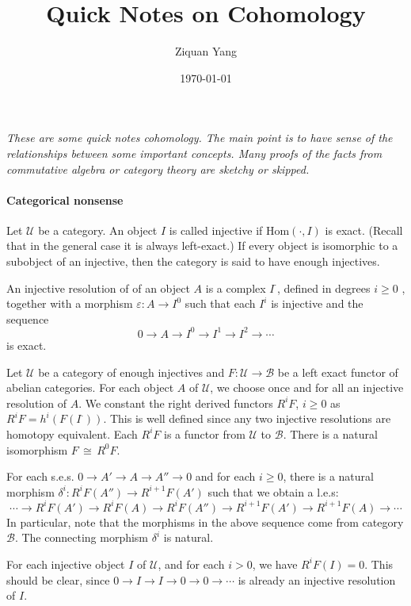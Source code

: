 \documentclass[12pt]{article}
\theoremstyle{plain}
\theoremstyle{definition}
\newcommand{\sB}{\mathcal{B}}
\newcommand{\sU}{\mathcal{U}}
\newcommand{\Hom}{\mathrm{Hom}}
\newcommand\iso{{\, \cong \,}}
\newcommand{\<}{\langle}
\renewcommand{\>}{\rangle}
\newcommand{\sm}{\varepsilon}
\begin{document}
%

\title{Quick Notes on Cohomology}
\author{Ziquan Yang}


\date{\today}

\maketitle

\textsl{These are some quick notes cohomology. The main point is to have sense of the relationships between some important concepts. Many proofs of the facts from commutative algebra or category theory are sketchy or skipped.}
 


\setcounter{section}{0}
\paragraph{Categorical nonsense}
Let $\sU$ be a category. An object $I$ is called injective if $\Hom(\cdot, I)$ is exact. (Recall that in the general case it is always left-exact.) If every object is isomorphic to a subobject of an injective, then the category is said to have enough injectives. 

An injective resolution of of an object $A$ is a complex $I^\cdot$, defined in degrees $i \ge 0$ , together with a morphism $\sm : A \to I^0$ such that each $I^i$ is injective and the sequence 
$$ 0 \to A \to I^0 \to I^1 \to I^2 \to \cdots $$
is exact. 

Let $\sU$ be a category of enough injectives and $F : \sU \to \sB$ be a left exact functor of abelian categories. For each object $A$ of $\sU$, we choose once and for all an injective resolution of $A$. We constant the right derived functors $R^i F$, $i \ge 0$ as $R^i F = h^i (F(I^\cdot))$. This is well defined since any two injective resolutions are homotopy equivalent. Each $R^i F$ is a functor from $\sU$ to $\sB$. There is a natural isomorphism $F \iso R^0 F$. 

For each s.e.s. $0 \to A' \to A \to A'' \to 0$ and for each $i \ge 0$, there is a natural morphism $\delta^i : R^i F (A'') \to R^{ i + 1} F(A')$ such that we obtain a l.e.s:
$$ \cdots \to R^i F(A') \to R^i F(A) \to R^i F (A'') \to R^{i + 1} F (A') \to R^{i + 1} F(A) \to \cdots $$
In particular, note that the morphisms in the above sequence come from category $\sB$. The connecting morphism $\delta^i$ is natural. 

For each injective object $I$ of $\sU$, and for each $i > 0$, we have $R^i F (I) = 0$. This should be clear, since $0 \to I \to I \to 0 \to 0 \to \cdots $ is already an injective resolution of $I$. 
\end{document}
